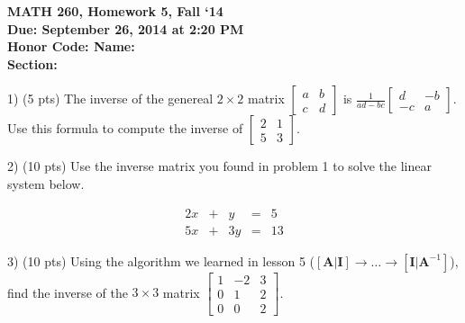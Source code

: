 \documentclass{article}
\begin{document}
\begin{flushleft}
	\bfseries{MATH 260, Homework 5, Fall `14}\\
	\bfseries{Due: September 26, 2014 at 2:20 PM}\\
	\bfseries{Honor Code:} \hspace{3.5in}\bfseries{Name:}\\
	\hspace{4.37in}\bfseries{Section:}
\end{flushleft}
\begin{flushleft}
\vspace{.25in}

1) (5 pts) The inverse of the genereal $2 \times 2$ matrix 
$\begin{bmatrix}
a & b\\
c & d
\end{bmatrix}$ is
$\frac{1}{ad - bc}\begin{bmatrix}
d & -b\\
-c & a
\end{bmatrix}$.  Use this formula to compute the inverse of $\begin{bmatrix}
2 & 1\\
5 & 3
\end{bmatrix}$.

\vspace{2in}

2) (10 pts) Use the inverse matrix you found in problem 1 to solve the linear system below.

\begin{equation*}
\begin{array}{ccccr}
2x  & + &   y  & = & 5\\
5x  & + &  3y  & = & 13
\end{array}
\end{equation*}

\pagebreak

3) (10 pts) Using the algorithm we learned in lesson 5 ($[\textbf{A} | \textbf{I}] \rightarrow \dots \rightarrow [\textbf{I} | \textbf{A}^{-1}]$), find the inverse of the $3 \times 3$ matrix
$\begin{bmatrix}
1 & -2 & 3\\
0 &  1 & 2\\
0 &  0 & 2
\end{bmatrix}$.

\end{flushleft}
\end{document}
